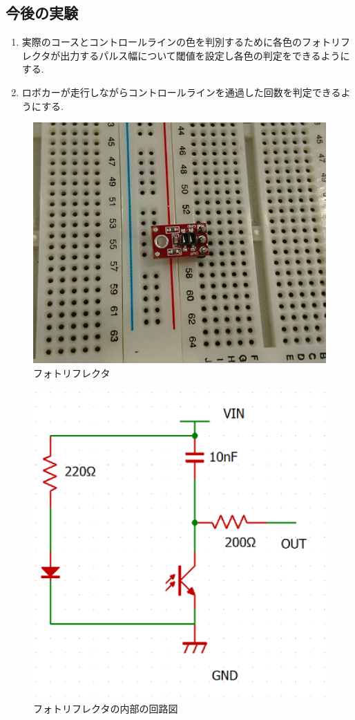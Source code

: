 \subsection{今後の実験}
\begin{enumerate}

	\item 実際のコースとコントロールラインの色を判別するために各色のフォトリフレクタが出力するパルス幅について閾値を設定し各色の判定をできるようにする.
	
	\item ロボカーが走行しながらコントロールラインを通過した回数を判定できるようにする.

\end{enumerate}

\begin{figure}[htb]
  \centering
    \includegraphics[width=0.5\hsize]{picture/eps/photosensor.eps}
    \caption{フォトリフレクタ}
    \label{fig::photosensor}
\end{figure}

\begin{figure}[htb]
  \centering
    \includegraphics[width=0.5\hsize]{picture/eps/photosensor_circit.eps}
    \caption{フォトリフレクタの内部の回路図}
    \label{fig::phses_cir}
\end{figure}